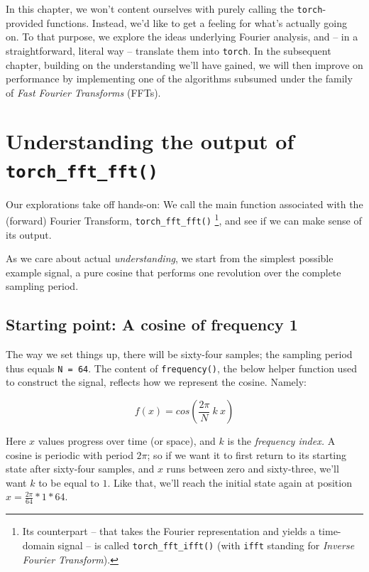 \documentclass[
  letterpaper,
]{krantz}
\begin{document}
In this chapter, we won't content ourselves with purely calling the
\texttt{torch}-provided functions. Instead, we'd like to get a feeling
for what's actually going on. To that purpose, we explore the ideas
underlying Fourier analysis, and -- in a straightforward, literal way --
translate them into \texttt{torch}. In the subsequent chapter, building
on the understanding we'll have gained, we will then improve on
performance by implementing one of the algorithms subsumed under the
family of \emph{Fast Fourier Transforms} (FFTs).

\hypertarget{understanding-the-output-of-torch_fft_fft}{%
\section{\texorpdfstring{Understanding the output of
\texttt{torch\_fft\_fft()}}{Understanding the output of torch\_fft\_fft()}}\label{understanding-the-output-of-torch_fft_fft}}

Our explorations take off hands-on: We call the main function associated
with the (forward) Fourier Transform, \texttt{torch\_fft\_fft()}
\footnote{Its counterpart -- that takes the Fourier representation and
  yields a time-domain signal -- is called
  \texttt{torch\_fft\_ifft()}
  (with \texttt{ifft} standing for \emph{Inverse Fourier Transform}).},
and see if we can make sense of its output.

As we care about actual \emph{understanding}, we start from the simplest
possible example signal, a pure cosine that performs one revolution over
the complete sampling period.

\hypertarget{starting-point-a-cosine-of-frequency-1}{%
\subsection{Starting point: A cosine of frequency
1}\label{starting-point-a-cosine-of-frequency-1}}

The way we set things up, there will be sixty-four samples; the sampling
period thus equals \texttt{N\ =\ 64}. The content of
\texttt{frequency()}, the below helper function used to construct the
signal, reflects how we represent the cosine. Namely:

\[
f(x) = cos(\frac{2 \pi}{N} \ k \ x)
\]

Here \(x\) values progress over time (or space), and \(k\) is the
\emph{frequency index.} A cosine is periodic with period \(2 \pi\); so
if we want it to first return to its starting state after sixty-four
samples, and \(x\) runs between zero and sixty-three, we'll want \(k\)
to be equal to \(1\). Like that, we'll reach the initial state again at
position \(x = \frac{2 \pi}{64} * 1 * 64\).
\end{document}
